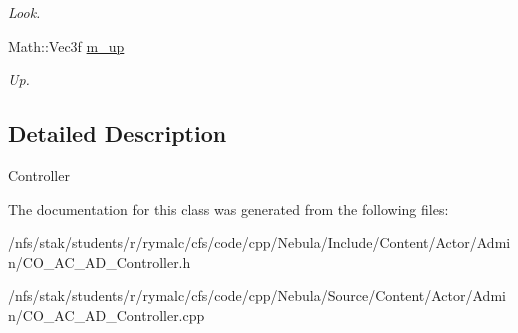 \begin{DoxyCompactItemize}
\begin{DoxyCompactList}\small\item\em Look. \item\end{DoxyCompactList}\item 
\hypertarget{classContent_1_1Actor_1_1Admin_1_1Controller_a57110492bf6e3c0af59b9b38396ae9f8}{
Math::Vec3f \hyperlink{classContent_1_1Actor_1_1Admin_1_1Controller_a57110492bf6e3c0af59b9b38396ae9f8}{m\_\-up}}
\label{classContent_1_1Actor_1_1Admin_1_1Controller_a57110492bf6e3c0af59b9b38396ae9f8}

\begin{DoxyCompactList}\small\item\em Up. \item\end{DoxyCompactList}\end{DoxyCompactItemize}


\subsection{Detailed Description}
Controller 

The documentation for this class was generated from the following files:\begin{DoxyCompactItemize}
\item 
/nfs/stak/students/r/rymalc/cfs/code/cpp/Nebula/Include/Content/Actor/Admin/CO\_\-AC\_\-AD\_\-Controller.h\item 
/nfs/stak/students/r/rymalc/cfs/code/cpp/Nebula/Source/Content/Actor/Admin/CO\_\-AC\_\-AD\_\-Controller.cpp\end{DoxyCompactItemize}

